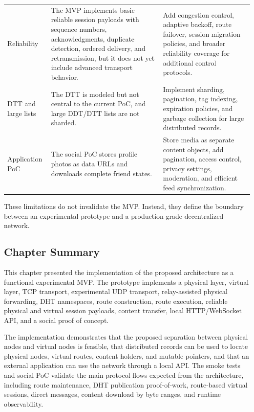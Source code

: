 \documentclass[12pt,a4paper]{article}
\begin{document}
\begin{longtable}{L{0.19\textwidth} L{0.34\textwidth} L{0.35\textwidth}}
Reliability & The MVP implements basic reliable session payloads with sequence numbers, acknowledgments, duplicate detection, ordered delivery, and retransmission, but it does not yet include advanced transport behavior. & Add congestion control, adaptive backoff, route failover, session migration policies, and broader reliability coverage for additional control protocols. \\

DTT and large lists & The DTT is modeled but not central to the current PoC, and large DDT/DTT lists are not sharded. & Implement sharding, pagination, tag indexing, expiration policies, and garbage collection for large distributed records. \\

Application PoC & The social PoC stores profile photos as data URLs and downloads complete friend states. & Store media as separate content objects, add pagination, access control, privacy settings, moderation, and efficient feed synchronization. \\
\end{longtable}
\endgroup

These limitations do not invalidate the MVP. Instead, they define the boundary between an experimental prototype and a production-grade decentralized network.

\subsection{Chapter Summary}
\label{sec:implementation-summary}

This chapter presented the implementation of the proposed architecture as a functional experimental MVP. The prototype implements a physical layer, virtual layer, TCP transport, experimental UDP transport, relay-assisted physical forwarding, DHT namespaces, route construction, route execution, reliable physical and virtual session payloads, content transfer, local HTTP/WebSocket API, and a social proof of concept.

The implementation demonstrates that the proposed separation between physical nodes and virtual nodes is feasible, that distributed records can be used to locate physical nodes, virtual routes, content holders, and mutable pointers, and that an external application can use the network through a local API. The smoke tests and social PoC validate the main protocol flows expected from the architecture, including route maintenance, DHT publication proof-of-work, route-based virtual sessions, direct messages, content download by byte ranges, and runtime observability.
\end{document}
